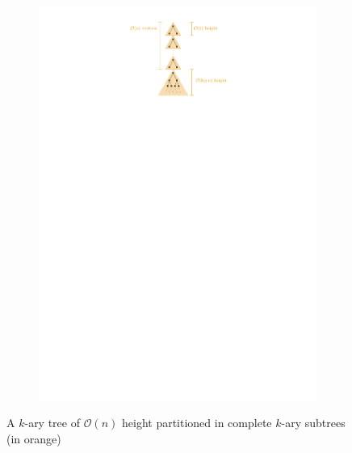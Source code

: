 	\begin{figure}[H]
	\centering
	\begin{subfigure}{\textwidth}
		\centering
		\includegraphics[page=1,width=0.7\linewidth]{graphics/k-ary_tree_partitioning_example.pdf}
	\end{subfigure}
	\caption{A $k$-ary tree of $\mathcal{O}(n)$ height partitioned in complete $k$-ary subtrees (in orange)}\label{im:partitioning_example}
\end{figure}


